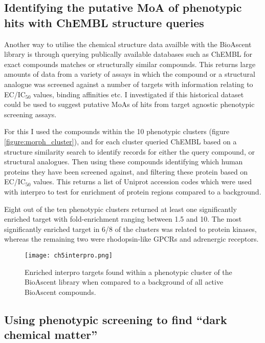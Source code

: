 \documentclass[a4paper,11pt,twoside,openright]{scrbook}
\begin{document}
\subsection{Identifying the putative MoA of phenotypic hits with ChEMBL structure queries}

Another way to utilise the chemical structure data availble with the BioAscent library is through querying publically available databases such as ChEMBL for exact compounds matches or structurally similar compounds.
This returns large amounts of data from a variety of assays in which the compound or a structural analogue was screened against a number of targets with information relating to EC/IC$_{50}$ values, binding affinities etc.
I investigated if this historical dataset could be used to suggest putative MoAs of hits from target agnostic phenotypic screening assays.

For this I used the compounds within the 10 phenotypic clusters (figure \ref{figure:morph_cluster}), and for each cluster queried ChEMBL based on a structure similarity search to identify records for either the query compound, or structural analogues.
Then using these compounds identifying which human proteins they have been screened against, and filtering these protein based on EC/IC$_{50}$ values.
This returns a list of Uniprot accession codes which were used with interpro \cite{Finn2017} to test for enrichment of protein regions compared to a background.

Eight out of the ten phenotypic clusters returned at least one significantly enriched target with fold-enrichment ranging between 1.5 and 10.
The most significantly enriched target in 6/8 of the clusters was related to protein kinases, whereas the remaining two were rhodopsin-like GPCRs and adrenergic receptors.

\begin{figure}
    \captionsetup{width=0.8\textwidth}
    \caption[Interpro target enrichment]{
        Enriched interpro targets found within a phenotypic cluster of the BioAscent library when compared to a background of all active BioAscent compounds.
}
    \texttt{[image: ch5interpro.png]}
    \label{figure:interpro}
\end{figure}



\subsection{Using phenotypic screening to find ``dark chemical matter''}
\end{document}
